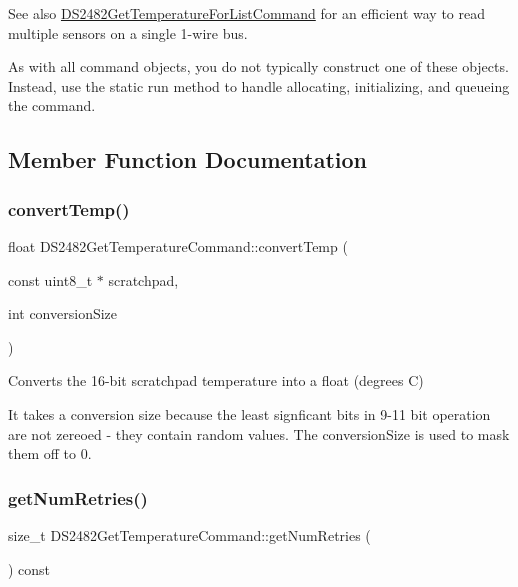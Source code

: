 See also \mbox{\hyperlink{class_d_s2482_get_temperature_for_list_command}{D\+S2482\+Get\+Temperature\+For\+List\+Command}} for an efficient way to read multiple sensors on a single 1-\/wire bus.

As with all command objects, you do not typically construct one of these objects. Instead, use the static run method to handle allocating, initializing, and queueing the command. 

\subsection{Member Function Documentation}
\mbox{\label{class_d_s2482_get_temperature_command_af5778f4b03a65c8dc1290516ac73fe92}} 
\subsubsection{\texorpdfstring{convert\+Temp()}{convertTemp()}}
{\footnotesize\ttfamily float D\+S2482\+Get\+Temperature\+Command\+::convert\+Temp (\begin{DoxyParamCaption}\item[{const uint8\+\_\+t $\ast$}]{scratchpad,  }\item[{int}]{conversion\+Size }\end{DoxyParamCaption})\hspace{0.3cm}{\ttfamily [static]}}



Converts the 16-\/bit scratchpad temperature into a float (degrees C) 

It takes a conversion size because the least signficant bits in 9-\/11 bit operation are not zereoed -\/ they contain random values. The conversion\+Size is used to mask them off to 0. \mbox{\label{class_d_s2482_get_temperature_command_a39a243094572d16385d8ef2ae5180d1f}} 
\subsubsection{\texorpdfstring{get\+Num\+Retries()}{getNumRetries()}}
{\footnotesize\ttfamily size\+\_\+t D\+S2482\+Get\+Temperature\+Command\+::get\+Num\+Retries (\begin{DoxyParamCaption}{ }\end{DoxyParamCaption}) const\hspace{0.3cm}{\ttfamily [inline]}}



